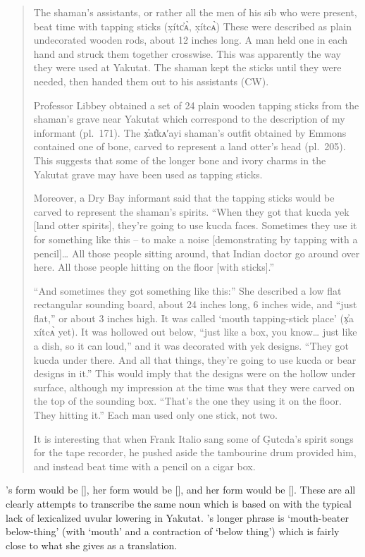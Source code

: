 \begin{quote}\small
The shaman’s assistants, or rather all the men of his sib who were present, beat time with tapping sticks (x̣ítc̓ᴀ̀, x̣ítcᴀ̀) These were described as plain undecorated wooden rods, about 12 inches long.
A man held one in each hand and struck them together crosswise.
This was apparently the way they were used at Yakutat.
The shaman kept the sticks until they were needed, then handed them out to his assistants (CW).

Professor Libbey obtained a set of 24 plain wooden tapping sticks from the shaman’s grave near Yakutat which correspond to the description of my informant (pl.\ 171).
The x̣̓at̓kᴀ′ayi shaman’s outfit obtained by Emmons contained one of bone, carved to represent a land otter’s head (pl.\ 205).
This suggests that some of the longer bone and ivory charms in the Yakutat grave may have been used as tapping sticks.

Moreover, a Dry Bay informant said that the tapping sticks would be carved to represent the shaman’s spirits. “When they got that kucda yek [land otter spirits], they’re going to use kucda faces.
Sometimes they use it for something like this – to make a noise [demonstrating by tapping with a pencil]… All those people sitting around, that Indian doctor go around over here.
All those people hitting on the floor [with sticks].”

“And sometimes they got something like this:” She described a low flat rectangular sounding board, about 24 inches long, 6 inches wide, and “just flat,” or about 3 inches high.
It was called ‘mouth tapping-stick place’ (x̣̓a xítcᴀ̀ yet).
It was hollowed out below, “just like a box, you know… just like a dish, so it can loud,” and it was decorated with yek designs. “They got kucda under there.
And all that things, they’re going to use kucda or bear designs in it.” This would imply that the designs were on the hollow under surface, although my impression at the time was that they were carved on the top of the sounding box. “That’s the one they using it on the floor.
They hitting it.” Each man used only one stick, not two.

It is interesting that when Frank Italio sang some of G̣utcda’s spirit songs for the tape recorder, he pushed aside the tambourine drum provided him, and instead beat time with a pencil on a cigar box.
\end{quote}

\citeauthor{de-laguna:1972}’s form  would be  [], her form  would be  [], and her form  would be  [].
These are all clearly attempts to transcribe the same noun which is  based on  with the typical lack of lexicalized uvular lowering in Yakutat.
\citeauthor{de-laguna:1972}’s longer phrase is  ‘mouth-beater below-thing’ (with  ‘mouth’ and  a contraction of  ‘below thing’) which is fairly close to what she gives as a translation.

